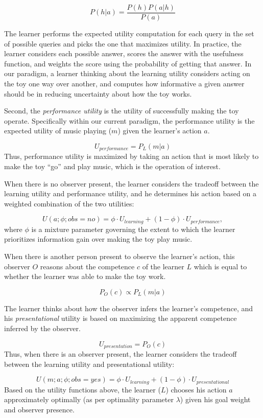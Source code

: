 \documentclass[10pt, letterpaper]{article}
\begin{document}
\[ P(h|a) = \frac{P(h)P(a|h)}{P(a)} \]

\noindent
The learner performs the expected utility computation for each query in
the set of possible queries and picks the one that maximizes utility. In
practice, the learner considers each possible answer, scores the answer
with the usefulness function, and weights the score using the
probability of getting that answer. In our paradigm, a learner thinking
about the learning utility considers acting on the toy one way over
another, and computes how informative a given answer should be in
reducing uncertainty about how the toy works.

Second, the \emph{performance utility} is the utility of successfully
making the toy operate. Specifically within our current paradigm, the
performance utility is the expected utility of music playing (\(m\))
given the learner's action \(a\).

\[ U_{performance} = P_L(m | a) \] \noindent
Thus, performance utility is maximized by taking an action that is most
likely to make the toy ``go'' and play music, which is the operation of
interest.

When there is no observer present, the learner considers the tradeoff
between the learning utility and performance utility, and he determines
his action based on a weighted combination of the two utilities:

\[ U(a;\phi; obs = no) = \phi \cdot U_{learning} + (1-\phi) \cdot U_{performance} ,\]
\noindent
where \(\phi\) is a mixture parameter governing the extent to which the
learner prioritizes information gain over making the toy play music.

When there is another person present to observe the learner's action,
this observer \(O\) reasons about the competence \(c\) of the learner
\(L\) which is equal to whether the learner was able to make the toy
work.

\[ P_O(c) \propto P_L(m | a)\]

The learner thinks about how the observer infers the learner's
competence, and his \emph{presentational} utility is based on maximizing
the apparent competence inferred by the observer.

\[ U_{presentation} = P_O(c) \] Thus, when there is an observer present,
the learner considers the tradeoff between the learning utility and
presentational utility:

\[ U(m;a;\phi; obs = yes) = \phi \cdot U_{learning} + (1-\phi) \cdot U_{presentational}\]
Based on the utility functions above, the learner (\(L\)) chooses his
action \(a\) approximately optimally (as per optimality parameter
\(\lambda\)) given his goal weight and observer presence.
\end{document}
